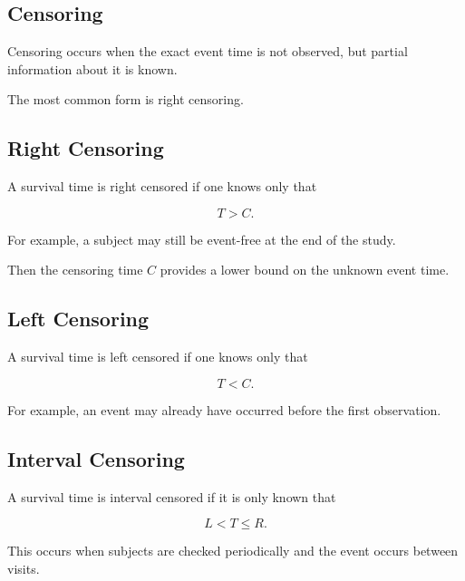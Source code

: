 \subsection{Censoring}
\label{subsec:censoring}

Censoring occurs when the exact event time is not observed, but partial
information about it is known.

The most common form is right censoring.

\subsection{Right Censoring}
\label{subsec:right-censoring}

A survival time is right censored if one knows only that

\[
\boxed{
T>C.
}
\]

For example, a subject may still be event-free at the end of the study.

Then the censoring time \(C\) provides a lower bound on the unknown event
time.

\subsection{Left Censoring}
\label{subsec:left-censoring}

A survival time is left censored if one knows only that

\[
\boxed{
T<C.
}
\]

For example, an event may already have occurred before the first
observation.

\subsection{Interval Censoring}
\label{subsec:interval-censoring}

A survival time is interval censored if it is only known that

\[
\boxed{
L<T\leq R.
}
\]

This occurs when subjects are checked periodically and the event occurs
between visits.

